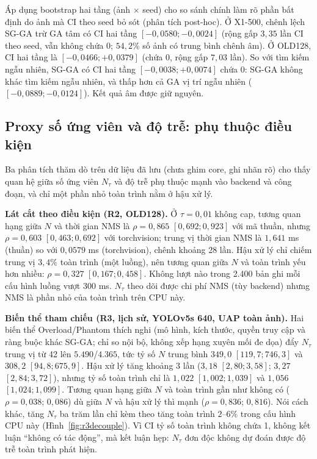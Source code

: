 \documentclass[a4paper,fleqn]{cas-dc}
\begin{document}
Áp dụng bootstrap hai tầng (ảnh $\times$ seed) cho so sánh chính làm rõ phần bất định do ảnh mà CI theo seed bỏ sót (phân tích post-hoc). Ở X1-500, chênh lệch SG-GA trừ GA tâm có CI hai tầng $[-0{,}0580;-0{,}0024]$ (rộng gấp $3{,}35$ lần CI theo seed, vẫn không chứa 0; $54{,}2\%$ số ảnh có trung bình chênh âm). Ở OLD128, CI hai tầng là $[-0{,}0466;+0{,}0379]$ (chứa 0, rộng gấp $7{,}03$ lần). So với tìm kiếm ngẫu nhiên, SG-GA có CI hai tầng $[-0{,}0038;+0{,}0074]$ chứa 0: SG-GA không khác tìm kiếm ngẫu nhiên, và thấp hơn cả GA vị trí ngẫu nhiên ($[-0{,}0889;-0{,}0124]$). Kết quả âm được giữ nguyên.

\subsection{Proxy số ứng viên và độ trễ: phụ thuộc điều kiện}

Ba phân tích thăm dò trên dữ liệu đã lưu (chưa ghim core, ghi nhãn rõ) cho thấy quan hệ giữa số ứng viên $N_\tau$ và độ trễ phụ thuộc mạnh vào backend và công đoạn, và chỉ một phần nhỏ toàn trình nằm ở hậu xử lý.

\textbf{Lát cắt theo điều kiện (R2, OLD128).} Ở $\tau=0{,}01$ không cap, tương quan hạng giữa $N$ và thời gian NMS là $\rho=0{,}865$ $[0{,}692;0{,}923]$ với mã thuần, nhưng $\rho=0{,}603$ $[0{,}463;0{,}692]$ với torchvision; trung vị thời gian NMS là $1{,}641$ ms (thuần) so với $0{,}0579$ ms (torchvision), chênh khoảng 28 lần. Hậu xử lý chỉ chiếm trung vị $3{,}4\%$ toàn trình (một luồng), nên tương quan giữa $N$ và toàn trình yếu hơn nhiều: $\rho=0{,}327$ $[0{,}167;0{,}458]$. Không lượt nào trong 2.400 bản ghi mỗi cấu hình luồng vượt 300 ms. $N_\tau$ theo dõi được chi phí NMS (tùy backend) nhưng NMS là phần nhỏ của toàn trình trên CPU này.

\textbf{Biến thể tham chiếu (R3, lịch sử, YOLOv5s 640, UAP toàn ảnh).} Hai biến thể Overload/Phantom thích nghi (mô hình, kích thước, quyền truy cập và ràng buộc khác SG-GA; chỉ so nội bộ, không xếp hạng xuyên mối đe dọa) đẩy $N_\tau$ trung vị từ 42 lên $5.490$/$4.365$, tức tỷ số $N$ trung bình $349{,}0$ $[119{,}7;746{,}3]$ và $308{,}2$ $[94{,}8;675{,}9]$. Hậu xử lý tăng khoảng $3$ lần ($3{,}18$ $[2{,}80;3{,}58]$; $3{,}27$ $[2{,}84;3{,}72]$), nhưng tỷ số toàn trình chỉ là $1{,}022$ $[1{,}002;1{,}039]$ và $1{,}056$ $[1{,}024;1{,}099]$. Tương quan hạng giữa $N$ và toàn trình gần như không có ($\rho=0{,}038$; $0{,}086$) dù giữa $N$ và hậu xử lý thì mạnh ($\rho=0{,}836$; $0{,}816$). Nói cách khác, tăng $N_\tau$ ba trăm lần chỉ kèm theo tăng toàn trình $2$--$6\%$ trong cấu hình CPU này (Hình~\ref{fig:r3decouple}). Vì CI tỷ số toàn trình không chứa 1, không kết luận ``không có tác động'', mà kết luận hẹp: $N_\tau$ đơn độc không dự đoán được độ trễ toàn trình phát hiện.
\end{document}
